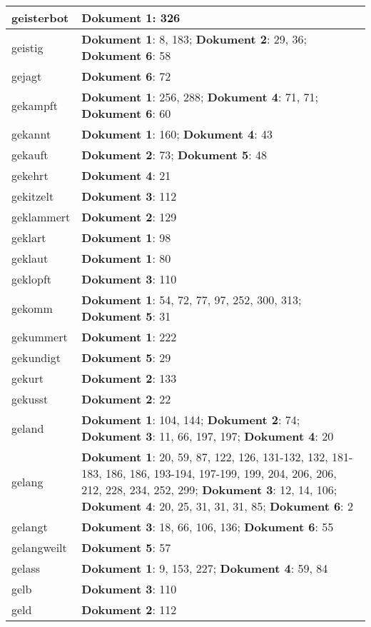 \documentclass[a5paper]{article}
\begin{document}
\begin{longtable}[l]{|l|p{3in}|}
\hline
geisterbot & \textbf{Dokument 1}: 326 \\
\hline
geistig & \textbf{Dokument 1}: 8, 183; \textbf{Dokument 2}: 29, 36; \textbf{Dokument 6}: 58 \\
\hline
gejagt & \textbf{Dokument 6}: 72 \\
\hline
gekampft & \textbf{Dokument 1}: 256, 288; \textbf{Dokument 4}: 71, 71; \textbf{Dokument 6}: 60 \\
\hline
gekannt & \textbf{Dokument 1}: 160; \textbf{Dokument 4}: 43 \\
\hline
gekauft & \textbf{Dokument 2}: 73; \textbf{Dokument 5}: 48 \\
\hline
gekehrt & \textbf{Dokument 4}: 21 \\
\hline
gekitzelt & \textbf{Dokument 3}: 112 \\
\hline
geklammert & \textbf{Dokument 2}: 129 \\
\hline
geklart & \textbf{Dokument 1}: 98 \\
\hline
geklaut & \textbf{Dokument 1}: 80 \\
\hline
geklopft & \textbf{Dokument 3}: 110 \\
\hline
gekomm & \textbf{Dokument 1}: 54, 72, 77, 97, 252, 300, 313; \textbf{Dokument 5}: 31 \\
\hline
gekummert & \textbf{Dokument 1}: 222 \\
\hline
gekundigt & \textbf{Dokument 5}: 29 \\
\hline
gekurt & \textbf{Dokument 2}: 133 \\
\hline
gekusst & \textbf{Dokument 2}: 22 \\
\hline
geland & \textbf{Dokument 1}: 104, 144; \textbf{Dokument 2}: 74; \textbf{Dokument 3}: 11, 66, 197, 197; \textbf{Dokument 4}: 20 \\
\hline
gelang & \textbf{Dokument 1}: 20, 59, 87, 122, 126, 131-132, 132, 181-183, 186, 186, 193-194, 197-199, 199, 204, 206, 206, 212, 228, 234, 252, 299; \textbf{Dokument 3}: 12, 14, 106; \textbf{Dokument 4}: 20, 25, 31, 31, 31, 85; \textbf{Dokument 6}: 2 \\
\hline
gelangt & \textbf{Dokument 3}: 18, 66, 106, 136; \textbf{Dokument 6}: 55 \\
\hline
gelangweilt & \textbf{Dokument 5}: 57 \\
\hline
gelass & \textbf{Dokument 1}: 9, 153, 227; \textbf{Dokument 4}: 59, 84 \\
\hline
gelb & \textbf{Dokument 3}: 110 \\
\hline
geld & \textbf{Dokument 2}: 112 \\

\end{longtable}
\end{document}

